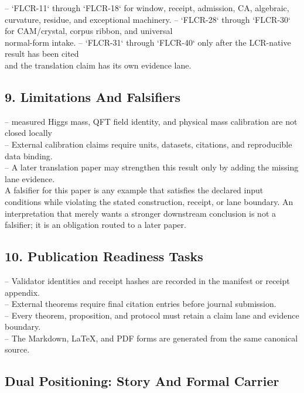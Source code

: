 \documentclass[11pt]{article}
\begin{document}
\noindent{}-- `FLCR-11` through `FLCR-18` for window, receipt, admission, CA, algebraic,\\
  curvature, residue, and exceptional machinery.
\noindent{}-- `FLCR-28` through `FLCR-30` for CAM/crystal, corpus ribbon, and universal\\
  normal-form intake.
\noindent{}-- `FLCR-31` through `FLCR-40` only after the LCR-native result has been cited\\
  and the translation claim has its own evidence lane.

\subsection*{9. Limitations And Falsifiers}

\noindent{}-- measured Higgs mass, QFT field identity, and physical mass calibration are not closed locally\\
\noindent{}-- External calibration claims require units, datasets, citations, and reproducible data binding.\\
\noindent{}-- A later translation paper may strengthen this result only by adding the missing lane evidence.\\

A falsifier for this paper is any example that satisfies the declared input
conditions while violating the stated construction, receipt, or lane boundary.
An interpretation that merely wants a stronger downstream conclusion is not a
falsifier; it is an obligation routed to a later paper.

\subsection*{10. Publication Readiness Tasks}

\noindent{}-- Validator identities and receipt hashes are recorded in the manifest or receipt appendix.\\
\noindent{}-- External theorems require final citation entries before journal submission.\\
\noindent{}-- Every theorem, proposition, and protocol must retain a claim lane and evidence boundary.\\
\noindent{}-- The Markdown, LaTeX, and PDF forms are generated from the same canonical source.\\

\subsection*{Dual Positioning: Story And Formal Carrier}
\end{document}
